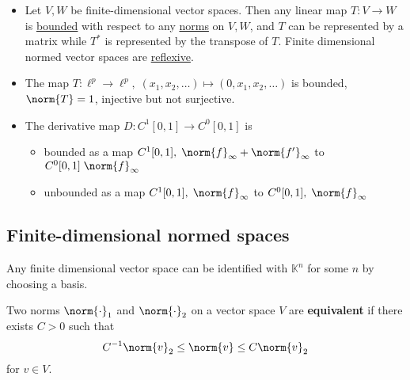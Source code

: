\documentclass{article}
\newcommand{\K}{\mathbb{K}}
\begin{document}
\begin{eg}
    \leavevmode
    \begin{itemize}
        \item Let $V, W$ be finite-dimensional vector spaces. Then any linear map $T:V \to W$ is \hyperlink{def:boundedLinearMap}{bounded} with respect to any \hyperlink{def:normedVectorSpace}{norms} on $V, W$, and $T$ can be represented by a matrix while $T^*$ is represented by the transpose of $T$.
            Finite dimensional normed vector spaces are \hyperlink{def:reflexive}{reflexive}.
        \item The map $T : \ell^p \to \ell^p, \; (x_1, x_2, \dotsc) \mapsto (0, x_1, x_2, \dotsc)$ is bounded, $\norm{T} = 1$, injective but not surjective.
        \item The derivative map $D: C^1 [0, 1] \to C^0 [0, 1]$ is
            \begin{itemize}[label={}]
                \item bounded as a map $C^1 [0, 1], \; \norm{f}_\infty + \norm{f'}_\infty$ to $C^0[0, 1] \; \norm{f}_\infty$
                \item unbounded as a map $C^1 [0, 1], \; \norm{f}_\infty$ to $C^0[0, 1], \; \norm{f}_\infty$
            \end{itemize}
    \end{itemize}
\end{eg}

\subsection{Finite-dimensional normed spaces}
\begin{fact}
    Any finite dimensional vector space can be identified with $\K^n$ for some $n$ by choosing a basis.
\end{fact}

\begin{defi}
    Two norms $\norm{\cdot}_1$ and $\norm{\cdot}_2$ on a vector space $V$ are \textbf{equivalent} if there exists $C > 0$ such that
    \begin{equation*}
        C^{-1} \norm{v}_2 \leq \norm{v} \leq C \norm{v}_2
    \end{equation*}
    for $v \in V$.
\end{defi}
\end{document}
